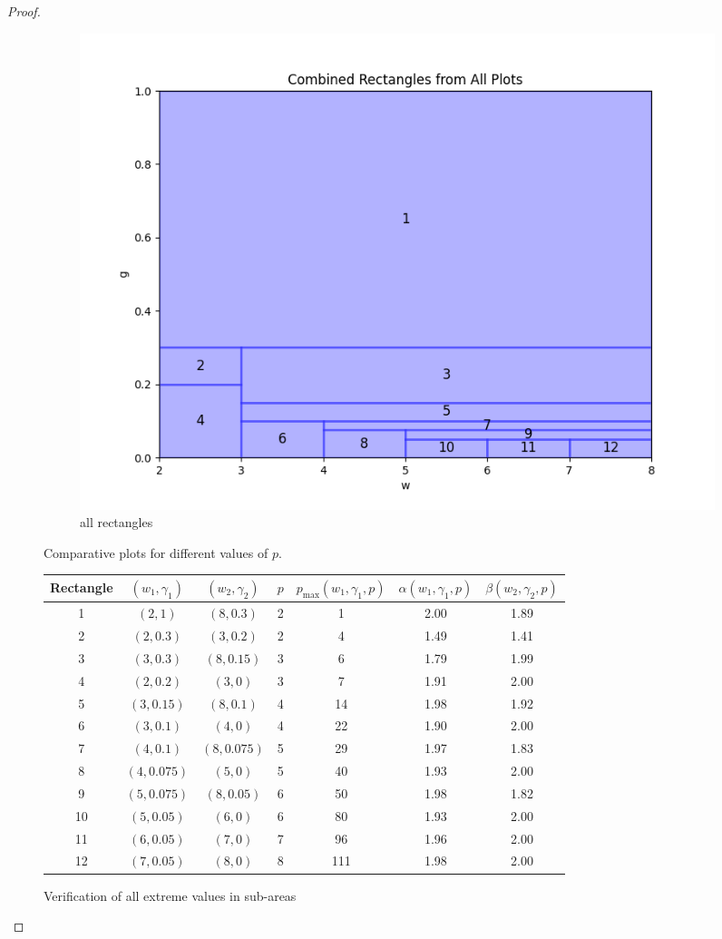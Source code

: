 \documentclass{article}
\begin{document}
\begin{proof}
\begin{figure}[ht]
\begin{subfigure}{0.32\textwidth}
        \includegraphics[width=\linewidth]{plotsexcom/rectanglesall.png}
        \caption{all rectangles}
    \end{subfigure}
    \caption{Comparative plots for different values of $p$.}
    \label{fig:all_plots}
\end{figure}

\begin{figure}
\center
\begin{tabular}{|c|c|c|c|c|c|c|}
\hline
Rectangle & $(w_1,\gamma_1)$ & $(w_2,\gamma_2)$ & $p$ & $p_{\max}(w_1,\gamma_1,p) $& $\alpha(w_1,\gamma_1,p)$ & $\beta(w_2,\gamma_2,p)$ \\
\hline
1 & $(2,1)$ & $(8,0.3)$ & 2 &1 & 2.00 & 1.89 \\
2 & $(2,0.3)$ & $(3,0.2)$ & 2 &4 & 1.49 & 1.41 \\
3 & $(3,0.3)$ & $(8,0.15)$ & 3 &6 & 1.79 & 1.99 \\
4 & $(2,0.2)$ & $(3,0)$ & 3 &7 & 1.91 & 2.00 \\
5 & $(3,0.15)$ & $(8,0.1)$ & 4 &14 & 1.98 & 1.92 \\
6 & $(3,0.1)$ & $(4,0)$ & 4 &22 & 1.90 & 2.00 \\
7 & $(4,0.1)$ & $(8,0.075)$ & 5 &29 & 1.97 & 1.83 \\
8 & $(4,0.075)$ & $(5,0)$ & 5 &40 & 1.93 & 2.00 \\
9 & $(5,0.075)$ & $(8,0.05)$ & 6 &50 & 1.98 & 1.82 \\
10 & $(5,0.05)$ & $(6,0)$ & 6 &80 & 1.93 & 2.00 \\
11 & $(6,0.05)$ & $(7,0)$ & 7 &96 & 1.96 & 2.00 \\
12 & $(7,0.05)$ & $(8,0)$ & 8 &111 & 1.98 & 2.00 \\
\hline
\end{tabular}
\label{fig.verif}
\caption{Verification of all extreme values in sub-areas}
\end{figure}




\end{proof}
\end{document}
